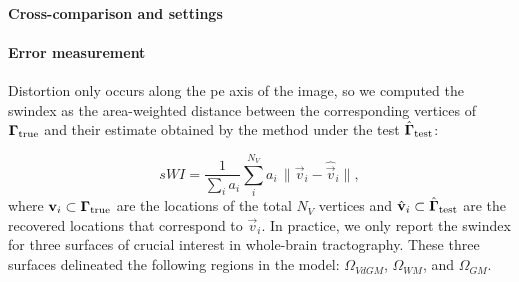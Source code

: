 \paragraph*{Cross-comparison and settings} %

\paragraph*{Error measurement}\label{sec:experiments_evaluation}
Distortion only occurs along the \gls*{pe} axis of the image, so we computed the
  \gls*{swindex} as the area-weighted distance between the corresponding vertices of
  $\boldsymbol{\Gamma}_\text{true}$ and their estimate obtained by the method under the test $\hat{\boldsymbol{\Gamma}}_\text{test}$:

  \begin{equation}
  sWI = \frac{1}{\sum_i a_i} \sum\limits_i^{N_V} a_i\,\|
  \vec{v}_i - \hat{\vec{v}}_i \|,
  \label{eq:swindex}
  \end{equation}
  where $\mathbf{v}_i \subset \boldsymbol{\Gamma}_\text{true}$ are the locations of the total $N_V$ vertices
  and $\hat{\mathbf{v}}_i \subset \hat{\boldsymbol{\Gamma}}_\text{test}$ are the recovered locations
  that correspond to $\vec{v}_i$.
In practice, we only report the \gls*{swindex} for three surfaces of crucial interest in whole-brain
  tractography.
These three surfaces delineated the following regions in the model: $\Omega_{VdGM}$, $\Omega_{WM}$, and $\Omega_{GM}$.